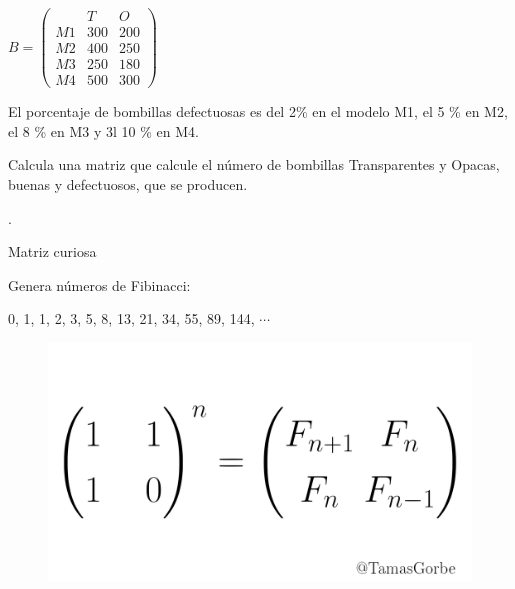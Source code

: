 \begin{enumerate}
\begin{multicols}{2}
$B=\left( \begin{matrix} &T&O\\M1&300&200\\M2&400&250\\M3&250&180\\M4&500&300 \end{matrix} \right)$

El porcentaje de bombillas defectuosas es del 2\% en el modelo M1, el 5 \% en M2, el 8 \% en M3 y 3l 10 \% en M4. 
\end{multicols}
Calcula una matriz que calcule el número de bombillas Transparentes y Opacas, buenas y defectuosos, que se producen.

.





\end{enumerate}

\begin{myexampleblock}{Matriz curiosa}

Genera números de Fibinacci: 

\hspace{25mm}0, 1, 1, 2, 3, 5, 8, 13, 21, 34, 55, 89, 144, $\cdots$

\vspace{-10mm}

\begin{figure}[H]
	\centering
	\includegraphics[width=1\textwidth]{imagenes/imagenes03/T03IM03.png}
\end{figure}

\end{myexampleblock}


